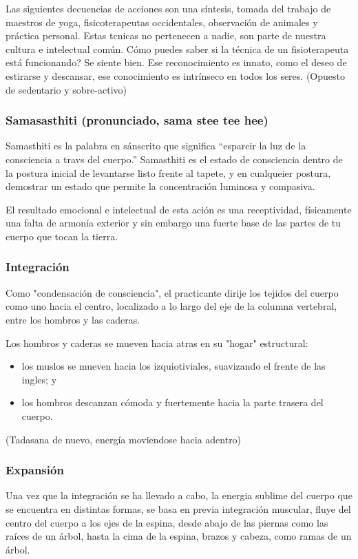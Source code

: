 Las siguientes decuencias de acciones son una síntesis, tomada del trabajo de maestros de yoga, fisicoterapeutas occidentales, observación de animales y práctica personal. Estas tcnicas no pertenecen a nadie, son parte de nuestra cultura e intelectual común. Cómo puedes saber si la t\'ecnica de un fisioterapeuta está funcionando? Se siente bien. Ese reconocimiento es innato, como el deseo de estirarse y descansar, ese conocimiento es intrínseco en todos los seres. (Opuesto de sedentario y sobre-activo)

\subsubsection{Samasasthiti (pronunciado, sama stee tee hee)}
Samasthiti es la palabra en sánscrito que significa ``esparcir la luz de la consciencia a travs del cuerpo.'' Samasthiti es el estado de consciencia dentro de la postura inicial de levantarse listo frente al tapete, y en cualqueier postura, demostrar un estado que permite la concentración luminosa y compasiva.

El resultado emocional e intelectual de esta ación es una receptividad, físicamente una falta de armonía exterior y sin embargo una fuerte base de las partes de tu cuerpo que tocan la tierra.

\subsubsection{Integración}
Como "condensaci\'on de consciencia", el practicante dirije los tejidos del cuerpo como uno hacia el centro, localizado a lo largo del eje de la columna vertebral, entre los hombros y las caderas.

Los hombros y caderas se mueven hacia atras en su "hogar" estructural:
\begin{itemize}
	\item los muslos se mueven hacia los izquiotiviales, suavizando el frente de las ingles; y
	\item los hombros descanzan c\'omoda y fuertemente hacia la parte trasera del cuerpo.
\end{itemize}
(Tadasana de nuevo, energ\'ia moviendose hacia adentro)

\subsubsection{Expansi\'on}
Una vez que la integración se ha llevado a cabo, la energia sublime del cuerpo que se encuentra en distintas formas, se basa en previa integración muscular, fluye del centro del cuerpo a los ejes de la espina, desde abajo de las piernas como las raíces de un árbol, hasta la cima de la espina, brazos y cabeza, como ramas de un árbol.

